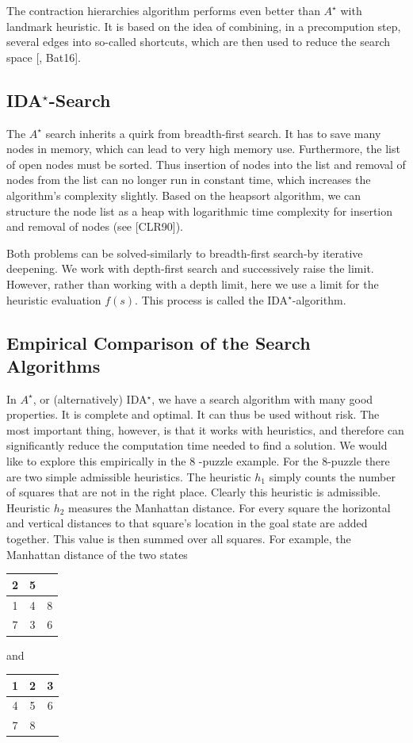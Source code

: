 \documentclass[10pt]{book}
\begin{document}
The contraction hierarchies algorithm performs even better than $A^{\star}$ with landmark heuristic. It is based on the idea of combining, in a precompution step, several edges into so-called shortcuts, which are then used to reduce the search space [\cite{geisberger2008contraction}, Bat16].

\subsection{IDA$^{\star}$-Search}
The $A^{\star}$ search inherits a quirk from breadth-first search. It has to save many nodes in memory, which can lead to very high memory use. Furthermore, the list of open nodes must be sorted. Thus insertion of nodes into the list and removal of nodes from the list can no longer run in constant time, which increases the algorithm's complexity slightly. Based on the heapsort algorithm, we can structure the node list as a heap with logarithmic time complexity for insertion and removal of nodes (see [CLR90]).

Both problems can be solved-similarly to breadth-first search-by iterative deepening. We work with depth-first search and successively raise the limit. However, rather than working with a depth limit, here we use a limit for the heuristic evaluation $f(s)$. This process is called the IDA$^{\star}$-algorithm.

\subsection{Empirical Comparison of the Search Algorithms}
In $A^{\star}$, or (alternatively) IDA$^{\star}$, we have a search algorithm with many good properties. It is complete and optimal. It can thus be used without risk. The most important thing, however, is that it works with heuristics, and therefore can significantly reduce the computation time needed to find a solution. We would like to explore this empirically in the 8 -puzzle example.
For the 8-puzzle there are two simple admissible heuristics. The heuristic $h_{1}$ simply counts the number of squares that are not in the right place. Clearly this heuristic is admissible. Heuristic $h_{2}$ measures the Manhattan distance. For every square the horizontal and vertical distances to that square's location in the goal state are added together. This value is then summed over all squares. For example, the Manhattan distance of the two states

\begin{center}
\begin{tabular}{|c|c|c|}
\hline
2 & 5 &  \\
\hline
1 & 4 & 8 \\
\hline
7 & 3 & 6 \\
\hline
\end{tabular}
\qquad and \qquad
\begin{tabular}{|c|c|c|}
\hline
1 & 2 & 3 \\
\hline
4 & 5 & 6 \\
\hline
7 & 8 &  \\
\hline
\end{tabular}
\end{center}
\end{document}
